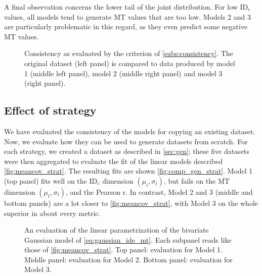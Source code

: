 \documentclass[manuscript,review,anonymous]{acmart}
\newcommand{\mmt}{\ensuremath{\overline{\text{MT}}}\xspace}
\newcommand{\ide}{\ensuremath{{\text{ID}_e}}\xspace}
\begin{document}
A final observation concerns the lower tail of the joint distribution. For low \ide values, all models tend to generate MT values that are too low. Models 2 and 3 are particularly problematic in this regard, as they even predict some negative MT values.


\begin{figure}[htbp]
	\centering
	\caption{Consistency as evaluated by the criterion of \autoref{subs:consistency}. The original dataset (left panel) is compared to data produced by model 1 (middle left panel), model 2 (middle right panel) and model 3 (right panel).}
	\label{fig:consistency}
\end{figure}


\subsection{Effect of strategy}
We have evaluated the consistency of the models for copying an existing dataset. Now, we evaluate how they can be used to generate datasets from scratch. For each strategy, we created a dataset as described in \autoref{sec:gen}; these five datasets were then aggregated to evaluate the fit of the linear models described \autoref{fig:meancov_strat}.
The resulting fits are shown \autoref{fig:comp_gen_strat}. Model 1 (top panel) fits well on the \ide dimension $(\mu_i, \sigma_i)$, but fails on the \mmt dimension $(\mu_t, \sigma_t)$, and the Pearson r. In contrast, Model 2 and 3 (middle and bottom panels) are a lot closer to \autoref{fig:meancov_strat}, with Model 3 on the whole superior in about every metric.

\begin{figure}[htbp]
	\centering

	\caption{An evaluation of the linear parametrization of the bivariate Gaussian model of \autoref{eq:gaussian_ide_mt}. Each subpanel reads like those of \autoref{fig:meancov_strat}. Top panel: evaluation for Model 1. Middle panel: evaluation for Model 2. Bottom panel: evaluation for Model 3.}
	\label{fig:comp_gen_strat}
\end{figure}
\end{document}

